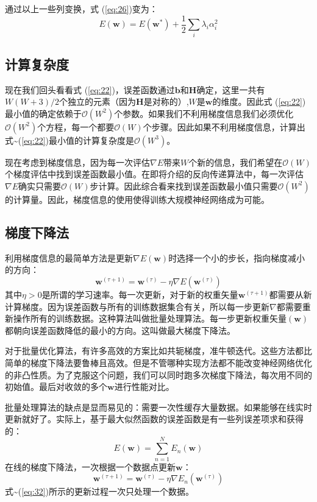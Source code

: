 \documentclass[10pt,a4paper,UTF8]{article}
\begin{document}
通过以上一些列变换，式 (\ref{eq:26})变为：
\begin{equation}
\label{eq:29}
E(\mathbf{w}) = E(\mathbf{w}^{*}) + \frac{1}{2}\sum_{i}\lambda_{i}\alpha_{i}^{2}
\end{equation}
\subsection{计算复杂度}
\label{sec:org0236c61}

现在我们回头看看式 (\ref{eq:22})，误差函数通过\(\mathbf{b}\)和\(\mathbf{H}\)确定，这里一共有\(W(W+3)/2\)个独立的元素（因为\(\mathbf{H}\)是对称的）,\(W\)是\(\mathbf{w}\)的维度。因此式 (\ref{eq:22})最小值的确定依赖于\(\mathcal{O}(W^{2})\)个参数。如果我们不利用梯度信息我们必须优化\(\mathcal{O}(W^{2})\)个方程，每一个都要\(\mathcal{O}(W)\)个步骤。因此如果不利用梯度信息，计算出式\textasciitilde{}(\ref{eq:22})最小值的计算复杂度是\(\mathcal{O}(W^{3})\)。

现在考虑到梯度信息，因为每一次评估\(\nabla E\)带来\(W\)个新的信息，我们希望在\(\mathcal{O}(W)\)个梯度评估中找到误差函数最小值。在即将介绍的反向传递算法中，每一次评估\(\nabla E\)确实只需要\(\mathcal{O}(W)\)步计算。因此综合看来找到误差函数最小值只需要\(\mathcal{O}(W^{2})\)的计算量。因此，梯度信息的使用使得训练大规模神经网络成为可能。
\subsection{梯度下降法}
\label{sec:orgc0ad9b7}


利用梯度信息的最简单方法是更新\(\nabla E(\mathbf{w})\)时选择一个小的步长，指向梯度减小的方向：
\begin{equation}
\label{eq:30}
\mathbf{w}^{(\tau+1)} = \mathbf{w}^{(\tau)} - \eta \nabla E(\mathbf{w}^{(\tau)})
\end{equation}
其中\(\eta > 0\)是所谓的学习速率。每一次更新，对于新的权重矢量\(\mathbf{w}^{(\tau + 1)}\)都需要从新计算梯度。因为误差函数与所有的训练数据集合有关，所以每一步更新\(\nabla\)都需要重新操作所有的训练数据。这种算法叫做批量处理算法。每一步更新权重矢量\((\mathbf{w})\)都朝向误差函数降低的最小的方向。这叫做最大梯度下降法。

对于批量优化算法，有许多高效的方案比如共轭梯度，准牛顿迭代。这些方法都比简单的梯度下降法要鲁棒且高效。但是不管哪种实现方法都不能改变神经网络优化的非凸性质。为了克服这个问题，我们可以同时跑多次梯度下降法，每次用不同的初始值。最后对收敛的多个\(\mathbf{w}\)进行性能对比。

批量处理算法的缺点是显而易见的：需要一次性缓存大量数据。如果能够在线实时更新就好了。实际上，基于最大似然函数的误差函数是有一些列误差项求和获得的：
\begin{equation}
\label{eq:31}
E(\mathbf{w}) = \sum_{n=1}^{N} E_{n}(\mathbf{w})
\end{equation}
在线的梯度下降法，一次根据一个数据点更新\(\mathbf{w}\)：
\begin{equation}
\label{eq:32}
\mathbf{w}^{(\tau + 1)} = \mathbf{w}^{(\tau)} - \eta \nabla E_{n}(\mathbf{w}^{(\tau)})
\end{equation}
式\textasciitilde{}(\ref{eq:32})所示的更新过程一次只处理一个数据。
\end{document}
